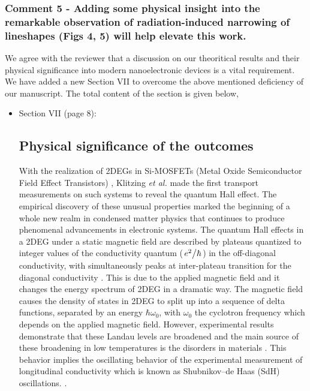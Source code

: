 \documentclass{article}
\begin{document}
\subsubsection*{Comment 5 -
\color{RoyalBlue} Adding some physical insight into the remarkable observation of radiation-induced narrowing of lineshapes (Figs 4, 5) will help elevate
this work.
}

We agree with the reviewer that a discussion on our theoritical results and their physical significance into modern nanoelectronic devices is a vital requirement. We have added a new Section VII to overcome the above mentioned deficiency of our manuscript. The total content of the section is given below,

\begin{itemize}
  \item Section VII (page 8):\\
  {\color{Maroon}
  \subsection*{Physical significance of the outcomes}

  With the realization of 2DEGs in Si-MOSFETs (Metal Oxide Semiconductor Field Effect Transistors) \cite{fowler66}, Klitzing \textit{et al.} \cite{klitzing80} made the first transport measurements on such systems to reveal the quantum Hall effect. The empirical discovery of these unusual properties marked the beginning of a whole new realm in condensed matter physics that continues to produce phenomenal advancements in electronic systems. The quantum Hall effects in a 2DEG under a static magnetic field are described by plateaus quantized to integer values of the conductivity quantum ($\flatfrac{e^2}{\hbar}$) in the off-diagonal conductivity, with simultaneously peaks at inter-plateau transition for the diagonal conductivity \cite{endo09}. This is due to the applied magnetic field and it changes the energy spectrum of 2DEG in a dramatic way. The magnetic field causes the density of states in 2DEG to split up into a sequence of delta functions, separated by an energy $\hbar\omega_0$, with $\omega_0$ the cyclotron frequency which depends on the applied magnetic field.
  However, experimental results demonstrate that these Landau levels are broadened and the main source of these broadening in low temperatures is the disorders in materials \cite{ando85,dial07}. This behavior implies the oscillating behavior of the experimental measurement of longitudinal conductivity which is known as Shubnikov–de Haas (SdH) oscillations. \cite{endo09,wakabayashi78}.

}
\end{itemize}
\end{document}
